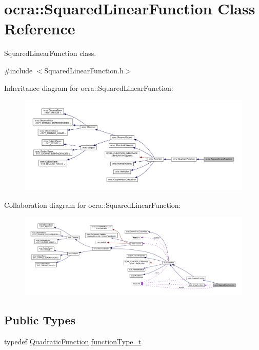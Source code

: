 \hypertarget{classocra_1_1SquaredLinearFunction}{}\section{ocra\+:\+:Squared\+Linear\+Function Class Reference}
\label{classocra_1_1SquaredLinearFunction}


Squared\+Linear\+Function class.  




{\ttfamily \#include $<$Squared\+Linear\+Function.\+h$>$}



Inheritance diagram for ocra\+:\+:Squared\+Linear\+Function\+:
\nopagebreak
\begin{figure}[H]
\begin{center}
\leavevmode
\includegraphics[width=350pt]{d7/d86/classocra_1_1SquaredLinearFunction__inherit__graph}
\end{center}
\end{figure}


Collaboration diagram for ocra\+:\+:Squared\+Linear\+Function\+:
\nopagebreak
\begin{figure}[H]
\begin{center}
\leavevmode
\includegraphics[width=350pt]{d2/d85/classocra_1_1SquaredLinearFunction__coll__graph}
\end{center}
\end{figure}
\subsection*{Public Types}
\begin{DoxyCompactItemize}
\item 
typedef \hyperlink{classocra_1_1QuadraticFunction}{Quadratic\+Function} \hyperlink{classocra_1_1SquaredLinearFunction_a7f1e0d7cfae65a8111bf6615f8c24f19}{function\+Type\+\_\+t}
\end{DoxyCompactItemize}
